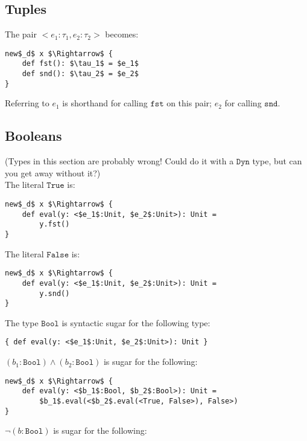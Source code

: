 \documentclass{llncs}
\newcommand{\keywadj}[1]{\mathtt{#1}}
\newcommand{\kwa}[1]{\keywadj{ #1 }}
\begin{document}
\subsection{Tuples}

The pair $<e_1: \tau_1, e_2: \tau_2>$ becomes:

\begin{lstlisting}
new$_d$ x $\Rightarrow$ {
    def fst(): $\tau_1$ = $e_1$
    def snd(): $\tau_2$ = $e_2$
}
\end{lstlisting}

\noindent
Referring to $e_1$ is shorthand for calling $\kwa{fst}$ on this pair; $e_2$ for calling $\kwa{snd}$.

\subsection{Booleans}

(Types in this section are probably wrong! Could do it with a $\kwa{Dyn}$ type, but can you get away without it?) \\

\noindent
The literal $\kwa{True}$ is:

\begin{lstlisting}
new$_d$ x $\Rightarrow$ {
    def eval(y: <$e_1$:Unit, $e_2$:Unit>): Unit =
        y.fst()
}
\end{lstlisting}

\noindent
The literal $\kwa{False}$ is:

\begin{lstlisting}
new$_d$ x $\Rightarrow$ {
    def eval(y: <$e_1$:Unit, $e_2$:Unit>): Unit =
        y.snd()
}
\end{lstlisting}

\noindent
The type $\kwa{Bool}$ is syntactic sugar for the following type:

\begin{lstlisting}
{ def eval(y: <$e_1$:Unit, $e_2$:Unit>): Unit }
\end{lstlisting}

\noindent
$(b_1 : \kwa{Bool}) \land (b_2 : \kwa{Bool})$ is sugar for the following:

\begin{lstlisting}
new$_d$ x $\Rightarrow$ {
    def eval(y: <$b_1$:Bool, $b_2$:Bool>): Unit =
        $b_1$.eval(<$b_2$.eval(<True, False>), False>)
}
\end{lstlisting}

\noindent
$\neg (b : \kwa{Bool})$ is sugar for the following:
\end{document}
